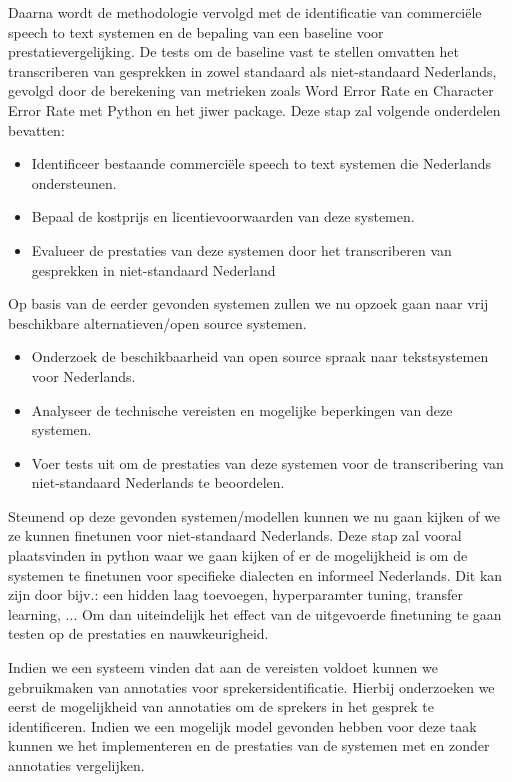 \par Daarna wordt de methodologie vervolgd met de identificatie van commerciële speech to text systemen en de bepaling van een baseline voor prestatievergelijking. De tests om de baseline vast te stellen omvatten het transcriberen van gesprekken in zowel standaard als niet-standaard Nederlands, gevolgd door de berekening van metrieken zoals Word Error Rate en Character Error Rate met Python en het jiwer package.
Deze stap zal volgende onderdelen bevatten:
\begin{itemize}
    \item Identificeer bestaande commerciële speech to text systemen die Nederlands ondersteunen.
    \item Bepaal de kostprijs en licentievoorwaarden van deze systemen.
    \item Evalueer de prestaties van deze systemen door het transcriberen van gesprekken in niet-standaard Nederland
\end{itemize}   
\par Op basis van de eerder gevonden systemen zullen we nu opzoek gaan naar vrij beschikbare alternatieven/open source systemen.
\begin{itemize}
    \item Onderzoek de beschikbaarheid van open source spraak naar tekstsystemen voor Nederlands.
    \item Analyseer de technische vereisten en mogelijke beperkingen van deze systemen.
    \item Voer tests uit om de prestaties van deze systemen voor de transcribering van niet-standaard Nederlands te beoordelen.
\end{itemize}
\par Steunend op deze gevonden systemen/modellen kunnen we nu gaan kijken of we ze kunnen finetunen voor niet-standaard Nederlands. Deze stap zal vooral plaatsvinden in python waar we gaan kijken of er de mogelijkheid is om de systemen te finetunen voor specifieke dialecten en informeel Nederlands. Dit kan zijn door bijv.: een hidden laag toevoegen, hyperparamter tuning, transfer learning, ... Om dan uiteindelijk het effect van de uitgevoerde finetuning te gaan testen op de prestaties en nauwkeurigheid.

\par Indien we een systeem vinden dat aan de vereisten voldoet kunnen we gebruikmaken van annotaties voor sprekersidentificatie. Hierbij onderzoeken we eerst de mogelijkheid van annotaties om de sprekers in het gesprek te identificeren. Indien we een mogelijk model gevonden hebben voor deze taak kunnen we het implementeren en de prestaties van de systemen met en zonder annotaties vergelijken.

